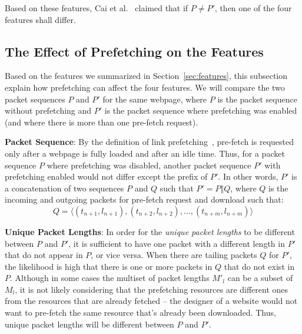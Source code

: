 Based on these features, Cai et al.~\cite{Cai:2014kjb} claimed that if $P \neq P'$, then one of the four features shall differ.


\subsection{The Effect of Prefetching on the Features}

Based on the features we summarized in Section~\ref{sec:features}, this subsection explain how prefetching can affect the four features.
We will compare the two packet sequences $P$ and $P'$ for the same webpage, where $P$ is the packet sequence without prefetching and $P'$ is the packet sequence where prefetching was enabled (and where there is more than one pre-fetch request).

{\bf Packet Sequence}:
By the definition of link prefetching~\cite{fisher2014link}, pre-fetch is requested only after a webpage is fully loaded and after an idle time.
Thus, for a packet sequence $P$ where prefetching was disabled, another packet sequence $P'$ with prefetching enabled would not differ except the prefix of $P'$.
In other words, $P'$ is a concatenation of two sequences $P$ and $Q$ such that $P' = P \Vert Q$, where $Q$ is the incoming and outgoing packets for pre-fetch request and download such that:
\begin{equation}
Q = \langle(t_{n+1}, l_{n+1}), (t_{n+2}, l_{n+2}), ..., (t_{n+m}, l_{n+m})\rangle
\end{equation}

{\bf Unique Packet Lengths}: 
In order for the {\it unique packet lengths} to be different between $P$ and $P'$, it is sufficient to have one packet with a different length in $P'$ that do not appear in $P$, or vice versa.
When there are tailing packets $Q$ for $P'$, the likelihood is high that there is one or more packets in $Q$ that do not exist in $P$.
Although in some cases the multiset of packet lengths $M'_l$ can be a subset of $M_l$, it is not likely considering that the prefetching resources are different ones from the resources that are already fetched -- the designer of a website would not want to pre-fetch the same resource that's already been downloaded.
Thus, unique packet lengths will be different between $P$ and $P'$.

